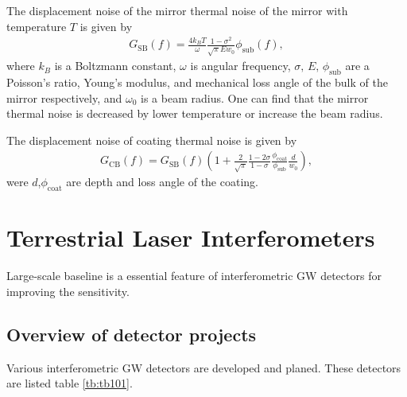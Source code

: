 The displacement noise of the mirror thermal noise of the mirror with temperature $T$ is given by \cite{levin1998internal,numata2003wide}
\begin{eqnarray}
  G_{\mathrm{SB}}(f)=\frac{4 k_{B} T}{\omega} \frac{1-\sigma^{2}}{\sqrt{\pi} E w_{0}} \phi_{\mathrm{sub}}(f),
  \label{eq:eq140}
\end{eqnarray}
where $k_{B}$ is a Boltzmann constant, $\omega$ is angular frequency, $\sigma,\,E,\, \phi_{\mathrm{sub}}$ are a Poisson's ratio, Young's modulus, and mechanical loss angle of the bulk of the mirror respectively, and $\omega_0$ is a beam radius. One can find that the mirror thermal noise is decreased by lower temperature or increase the beam radius.

The displacement noise of coating thermal noise is given by \cite{numata2003wide,harry2002thermal}
\begin{eqnarray}
  G_{\mathrm{CB}}(f)=G_{\mathrm{SB}}(f)\left(1+\frac{2}{\sqrt{\pi}} \frac{1-2 \sigma}{1-\sigma} \frac{\phi_{\mathrm{coat}}}{\phi_{\mathrm{sub}}} \frac{d}{w_{0}}\right), 
\end{eqnarray}
were $d$,$\phi_{\mathrm{coat}}$ are depth and loss angle of the coating.


\section{Terrestrial Laser Interferometers} \label{sec:14}
Large-scale baseline is a essential feature of interferometric GW detectors for improving the sensitivity. 

\subsection{Overview of detector projects}
Various interferometric GW detectors are developed and planed. These detectors are listed table \ref{tb:tb101}. 

